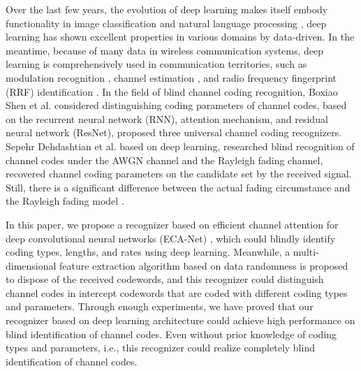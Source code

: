 \documentclass[conference]{IEEEtran}
\begin{document}
Over the last few years, the evolution of deep learning makes itself embody functionality in image classification \cite{chen2020sparsity} and natural language processing \cite{otter2020survey}, deep learning has shown excellent properties in various domains by data-driven. In the meantime, because of many data in wireless communication systems, deep learning is comprehensively used in communication territories, such as modulation recognition \cite{lin2022learning}, channel estimation \cite{hu2021semi}, and radio frequency fingerprint (RRF) identification \cite{shen2022towards}. In the field of blind channel coding recognition, Boxiao Shen et al. \cite{shen2021blind} considered distinguishing coding parameters of channel codes, based on the recurrent neural network (RNN), attention mechanism, and residual neural network (ResNet), proposed three universal channel coding recognizers. Sepehr Dehdashtian et al. \cite{dehdashtian2021deep} based on deep learning, researched blind recognition of channel codes under the AWGN channel and the Rayleigh fading channel, recovered channel coding parameters on the candidate set by the received signal. Still, there is a significant difference between the actual fading circumstance and the Rayleigh fading model \cite{besser2020reliability}.

In this paper, we propose a recognizer based on efficient channel attention for deep convolutional neural networks (ECA-Net) \cite{Wang_2020_CVPR}, which could blindly identify coding types, lengths, and rates using deep learning. Meanwhile, a multi-dimensional feature extraction algorithm based on data randomness \cite{liu2020security} is proposed to dispose of the received codewords, and this recognizer could distinguish channel codes in intercept codewords that are coded with different coding types and parameters. Through enough experiments, we have proved that our recognizer based on deep learning architecture could achieve high performance on blind identification of channel codes. Even without prior knowledge of coding types and parameters, i.e., this recognizer could realize completely blind identification of channel codes.
\end{document}
